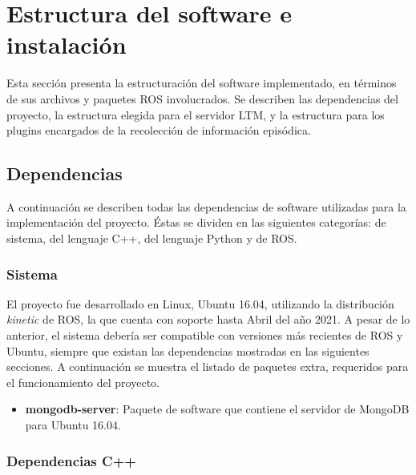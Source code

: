 \section{Estructura del software e instalación}

Esta sección presenta la estructuración del software implementado, en términos de sus archivos y paquetes ROS involucrados. Se describen las dependencias del proyecto, la estructura elegida para el servidor LTM, y la estructura para los plugins encargados de la recolección de información episódica.

\subsection{Dependencias}

A continuación se describen todas las dependencias de software utilizadas para la implementación del proyecto. Éstas se dividen en las siguientes categorías: de sistema, del lenguaje C++, del lenguaje Python y de ROS.


\subsubsection{Sistema}

El proyecto fue desarrollado en Linux, Ubuntu 16.04, utilizando la distribución \textit{kinetic} de ROS, la que cuenta con soporte hasta Abril del año 2021. A pesar de lo anterior, el sistema debería ser compatible con versiones más recientes de ROS y Ubuntu, siempre que existan las dependencias mostradas en las siguientes secciones. A continuación se muestra el listado de paquetes extra, requeridos para el funcionamiento del proyecto.

\begin{itemize}
\item {\bfseries mongodb-server}: Paquete de software que contiene el servidor de MongoDB para Ubuntu 16.04.
\end{itemize}


\subsubsection{Dependencias C++}

